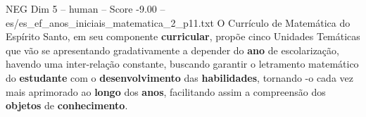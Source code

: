 \begin{textsample}{NEG Dim 5 – human – Score -9.00 – es/es\_ef\_anos\_iniciais\_matematica\_2\_p11.txt}  \label{ex:f5_neg_015}
O Currículo de Matemática do Espírito Santo, em seu componente \textbf{curricular}, propõe cinco Unidades Temáticas que vão se apresentando gradativamente a depender do \textbf{ano} de escolarização, havendo uma inter-relação constante, buscando garantir o letramento matemático do \textbf{estudante} com o \textbf{desenvolvimento} das \textbf{habilidades}, tornando -o cada vez mais aprimorado ao \textbf{longo} dos \textbf{anos}, facilitando assim a compreensão dos \textbf{objetos} de \textbf{conhecimento}.

\end{textsample}
